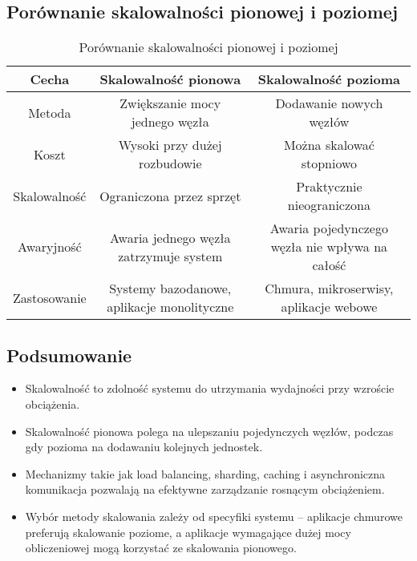 \subsection{Porównanie skalowalności pionowej i poziomej}

\begin{table}[h]
    \centering
    \renewcommand{\arraystretch}{1.3}
    \begin{tabular}{|c|c|c|}
        \hline
        \textbf{Cecha} & \textbf{Skalowalność pionowa} & \textbf{Skalowalność pozioma} \\
        \hline
        Metoda & Zwiększanie mocy jednego węzła & Dodawanie nowych węzłów \\
        \hline
        Koszt & Wysoki przy dużej rozbudowie & Można skalować stopniowo \\
        \hline
        Skalowalność & Ograniczona przez sprzęt & Praktycznie nieograniczona \\
        \hline
        Awaryjność & Awaria jednego węzła zatrzymuje system & Awaria pojedynczego węzła nie wpływa na całość \\
        \hline
        Zastosowanie & Systemy bazodanowe, aplikacje monolityczne & Chmura, mikroserwisy, aplikacje webowe \\
        \hline
    \end{tabular}
    \caption{Porównanie skalowalności pionowej i poziomej}
\end{table}

\subsection{Podsumowanie}
\begin{itemize}
    \item Skalowalność to zdolność systemu do utrzymania wydajności przy wzroście obciążenia.
    \item Skalowalność pionowa polega na ulepszaniu pojedynczych węzłów, podczas gdy pozioma na dodawaniu kolejnych jednostek.
    \item Mechanizmy takie jak load balancing, sharding, caching i asynchroniczna komunikacja pozwalają na efektywne zarządzanie rosnącym obciążeniem.
    \item Wybór metody skalowania zależy od specyfiki systemu – aplikacje chmurowe preferują skalowanie poziome, a aplikacje wymagające dużej mocy obliczeniowej mogą korzystać ze skalowania pionowego.
\end{itemize}
